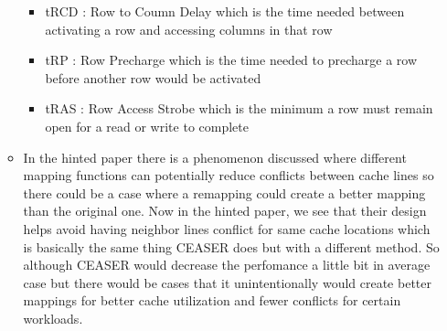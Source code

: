 \begin{enumerate}
\begin{itemize}
\begin{itemize}
            \item tRCD : Row to Coumn Delay which is the time needed between activating a row and accessing columns in that row
            \item tRP : Row Precharge which is the time needed to precharge a row before another row would be activated
            \item tRAS : Row Access Strobe which is the minimum a row must remain open for a read or write to complete
        \end{itemize}

        \item In the hinted paper there is a phenomenon discussed where different mapping functions can potentially 
        reduce conflicts between cache lines so there could be a case where a remapping could create a better mapping than the original one.
        Now in the hinted paper, we see that their design helps avoid having neighbor lines conflict for same cache locations which is basically the same thing CEASER does 
        but with a different method. So although CEASER would decrease the perfomance a little bit in average case but there would be cases that 
        it unintentionally would create better mappings for better cache utilization and fewer conflicts for certain workloads.
    \end{itemize}
\end{enumerate}